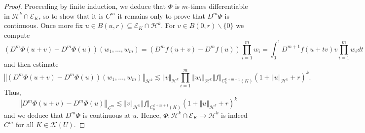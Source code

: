 \documentclass[10pt,a4paper]{amsart}
\theoremstyle{plain}
\theoremstyle{definition}
\theoremstyle{remark}
\def\L{\mathcal{L}}
\def\h{\mathcal{H}}
\def\ls{\lesssim}
\providecommand{\norm}[1]{\left\Vert#1\right\Vert}
\begin{document}
\begin{proof}
Proceeding by finite induction, we deduce that $\Phi$ is $m$-times differentiable in $\h^k \cap \mathcal{E}_K$, so to show that it is $C^m$ it remains only to prove that $D^m\Phi$ is continuous.  Once more fix $u \in B(u,r) \subseteq \mathcal{E}_K \cap \h^k$.  For $v \in B(0,r) \backslash \{0\}$ we compute 
\begin{equation}
(D^m \Phi(u+v)  - D^m\Phi(u)) (w_1,\dotsc,w_m) = (D^m f(u+v) -D^m f(u)) \prod_{i=1}^m w_i  
= \int_0^1 D^{m+1} f(u+tv)v \prod_{i=1}^m w_i dt 
\end{equation}
and then estimate 
\begin{equation}
 \norm{(D^m \Phi(u+v)  - D^m\Phi(u)) (w_1,\dotsc,w_m)}_{\h^k} \ls \norm{v}_{\h^k} \prod_{i=1}^m \norm{w_i}_{\h^k} \norm{f}_{C^{k+m+1}_b(K)} (1+ \norm{u}_{\h^k} + r)^k.
\end{equation}
Thus, 
\begin{equation}
  \norm{D^m \Phi(u+v)  - D^m\Phi(u) }_{\L^m} \ls \norm{v}_{\h^k} \norm{f}_{C^{k+m+1}_b(K)} (1+ \norm{u}_{\h^k} + r)^k
\end{equation}
and we deduce that $D^m \Phi$ is continuous at $u$.  Hence, $\Phi : \h^k \cap \mathcal{E}_K \to \h^k$ is indeed $C^m$ for all $K \in \mathcal{K}(U)$.
\end{proof}
\end{document}
